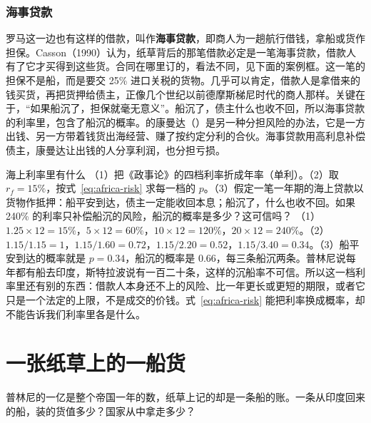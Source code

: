 \subsubsection{海事贷款}
罗马这一边也有这样的借款，叫作\textbf{海事贷款}，即商人为一趟航行借钱，拿船或货作担保。Casson（1990）认为，纸草背后的那笔借款必定是一笔海事贷款，借款人有了它才买得到这些货。合同在哪里订的，看法不同，见下面的案例框。这一笔的担保不是船，而是要交 25\% 进口关税的货物。几乎可以肯定，借款人是拿借来的钱买货，再把货押给债主，正像几个世纪以前德摩斯梯尼时代的商人那样\cite{casson1990}。关键在于，“如果船沉了，担保就毫无意义”\cite{casson1990}。船沉了，债主什么也收不回，所以海事贷款的利率里，包含了船沉的概率。的康曼达（）是另一种分担风险的办法，它是一方出钱、另一方带着钱货出海经营、赚了按约定分利的合伙。海事贷款用高利息补偿债主，康曼达让出钱的人分享利润，也分担亏损。

\begin{example}{海上利率里有什么}\label{ex:india-risk}
（1）把《政事论》的四档利率折成年率（单利）。（2）取 $r_f=15\%$，按式~\eqref{eq:africa-risk} 求每一档的 $p$。（3）假定一笔一年期的海上贷款以货物作抵押：船平安到达，债主一定能收回本息；船沉了，什么也收不回。如果 240\% 的利率只补偿船沉的风险，船沉的概率是多少？这可信吗？
\solution （1）$1.25\times12=15\%$，$5\times12=60\%$，$10\times12=120\%$，$20\times12=240\%$。（2）$1.15/1.15=1$，$1.15/1.60=0.72$，$1.15/2.20=0.52$，$1.15/3.40=0.34$。（3）船平安到达的概率就是 $p=0.34$，船沉的概率是 $0.66$，每三条船沉两条。普林尼说每年都有船去印度，斯特拉波说有一百二十条，这样的沉船率不可信。所以这一档利率里还有别的东西：借款人本身还不上的风险、比一年更长或更短的期限，或者它只是一个法定的上限，不是成交的价钱。式~\eqref{eq:africa-risk} 能把利率换成概率，却不能告诉我们利率里各是什么。
\end{example}


\section{一张纸草上的一船货}\label{sec:india-cargo}

普林尼的一亿是整个帝国一年的数，纸草上记的却是一条船的账。一条从印度回来的船，装的货值多少？国家从中拿走多少？

